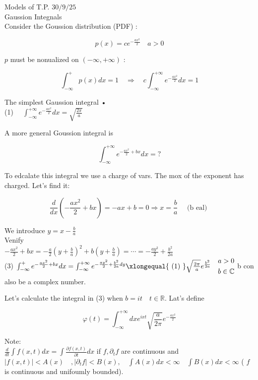 \documentclass[10pt]{article}
\begin{document}
Models of T.P. $30 / 9 / 25$\\
Gaussion Integnals\\
Consider the Goussion distribution (PDF) :

$$
p(x)=c e^{-\frac{a x^{2}}{2}} \quad a>0
$$

$p$ must be nonualized on $(-\infty,+\infty)$ :

$$
\int_{-\infty}^{+} p(x) d x=1 \quad \Rightarrow \quad c \int_{-\infty}^{+\infty} e^{-\frac{a x^{2}}{2}} d x=1
$$

The simplest Gaussion integral •\\
(1) $\quad \int_{-\infty}^{+\infty} e^{-\frac{a x^{2}}{2}} d x=\sqrt{\frac{2 \pi}{a}}$

A more general Goussion integral is


\begin{equation*}
\int_{-\infty}^{+\infty} e^{-\frac{a x^{2}}{2}+b x} d x=? \tag{2}
\end{equation*}


To edcalate this integral we use a charge of vars. The mox of the exponent has charged. Let's find it:

$$
\frac{d}{d x}\left(-\frac{a x^{2}}{2}+b x\right)=-a x+b=0 \Rightarrow x=\frac{b}{a} \quad \text { (b eal) }
$$

We introduce $y=x-\frac{b}{a}$\\
Venify\\
$-\frac{a x^{2}}{2}+b x=-\frac{a}{2}\left(y+\frac{b}{a}\right)^{2}+b\left(y+\frac{b}{a}\right)=\cdots=-\frac{a y^{2}}{2}+\frac{b^{2}}{2 a}$\\
(3) $\int_{-\infty}^{+} e^{-\frac{a x^{2}}{2}+b x} d x=\int_{-\infty}^{+\infty} e^{-\frac{a y^{2}}{2}+\frac{b^{2}}{2 a} d y} \xlongequal{\text { (1) }} \sqrt{\frac{2 \pi}{a}} e^{\frac{b^{2}}{2 a}} \quad \begin{aligned} & a>0 \\ & b \in \mathbb{C}\end{aligned}$ b con also be a complex number.

Let's calculate the integral in (3) when $b=i t \quad t \in \mathbb{R}$. Lat's define

$$
\varphi(t)=\int_{-\infty}^{+\infty} d x e^{i x t} \sqrt{\frac{a}{2 \pi}} e^{-\frac{a x^{2}}{2}}
$$

Note:\\
$\frac{d}{d t} \int f(x, t) d x=\int \frac{\partial f(x, t)}{\partial t} d x$ if $f, \partial_{t} f$ are continuous and $|f(x, t)|<A(x) \quad,\left|\partial_{t} f\right|<B(x), \quad \int A(x) d x<\infty \quad \int B(x) d x<\infty$ ( $f$ is continuous and unifoumly bounded).
\end{document}
